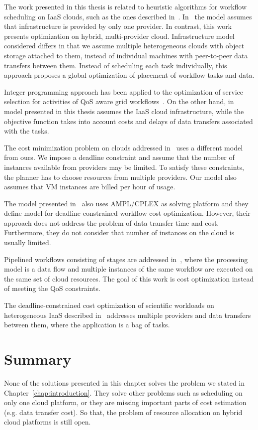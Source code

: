 The work presented in this thesis is related to heuristic algorithms for workflow scheduling on IaaS clouds, such as the ones described in~\cite{Abrishami2013158,Mao11,BarrionuevoFP12,BittencourtM11}. In~\cite{Abrishami2013158} the model assumes that infrastructure is provided by only one provider. In contrast, this work presents optimization on hybrid, multi-provider cloud. Infrastructure model considered differs in that we assume multiple heterogeneous clouds with object storage attached to them, instead of individual machines with peer-to-peer data transfers between them. Instead of scheduling each task individually, this approach proposes a global optimization of placement of workflow tasks and data.

Integer programming approach has been applied to the optimization of service selection for activities of QoS aware grid workflows~\cite{Brandic08}. On the other hand, in model presented in this thesis assumes the IaaS cloud infrastructure, while the objective function takes into account costs and delays of data transfers associated with the tasks.

The cost minimization problem on clouds addressed in~\cite{Pandey2010} uses a different model from ours. We impose a deadline constraint and assume that the number of instances available from providers may be limited. To satisfy these constraints, the planner has to choose resources from multiple providers. Our model also assumes that VM instances are billed per hour of usage.

The model presented in~\cite{Genez2012} also uses AMPL/CPLEX as solving platform and they define model for deadline-constrained workflow cost optimization. However, their approach does not address the problem of data transfer time and cost. Furthermore, they do not consider that number of instances on the cloud is usually limited. 

Pipelined workflows consisting of stages are addressed in~\cite{TolosanaCalasanz20121300}, where the processing model is a data flow and multiple instances of the same workflow are executed on the same set of cloud resources. The goal of this work is cost optimization instead of meeting the QoS constraints.

The deadline-constrained cost optimization of scientific workloads on heterogeneous IaaS described in~\cite{VandenBossche2013973} addresses multiple providers and data transfers between them, where the application is a bag of tasks.

\section{Summary}

None of the solutions presented in this chapter solves the problem we stated in Chapter~\ref{chap:introduction}. They solve other problems such as scheduling on only one cloud platform, or they are missing important parts of cost estimation (e.g. data transfer cost). So that, the problem of resource allocation on hybrid cloud platforms is still open.